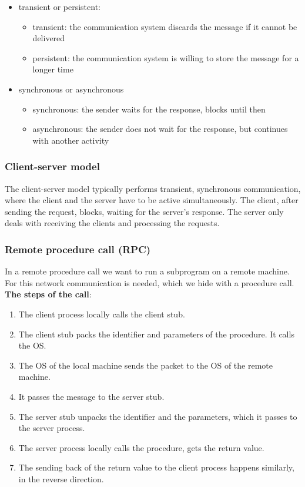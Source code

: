 \documentclass[margin=0px]{article}
\begin{document}
\begin{itemize}
    \item	transient or persistent:
          \begin{itemize}
              \item	transient: the communication system discards the message if it cannot be delivered
              \item	persistent: the communication system is willing to store the message for a longer time
          \end{itemize}
    \item	synchronous or asynchronous
          \begin{itemize}
              \item	synchronous: the sender waits for the response, blocks until then
              \item	asynchronous: the sender does not wait for the response, but continues with another activity
          \end{itemize}
\end{itemize}

\subsubsection{Client-server model}

The client-server model typically performs transient, synchronous communication, where the client and the server have to be
active simultaneously. The client, after sending the request, blocks, waiting for the server's response. The server only deals with
receiving the clients and processing the requests.

\subsubsection{Remote procedure call (RPC)}

In a remote procedure call we want to run a subprogram on a remote machine. For this network communication is needed,
which we hide with a procedure call.\\

\noindent \textbf{The steps of the call}:

\begin{enumerate}
    \item	The client process locally calls the client stub.
    \item	The client stub packs the identifier and parameters of the procedure. It calls the OS.
    \item	The OS of the local machine sends the packet to the OS of the remote machine.
    \item	It passes the message to the server stub.
    \item	The server stub unpacks the identifier and the parameters, which it passes to the server process.
    \item	The server process locally calls the procedure, gets the return value.
    \item	The sending back of the return value to the client process happens similarly, in the reverse direction.
\end{enumerate}
\end{document}
